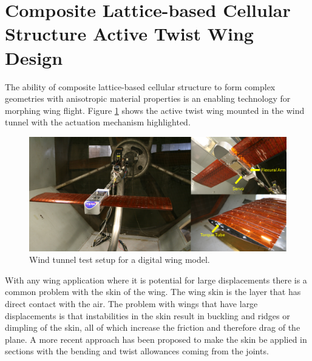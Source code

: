 \documentclass[11pt]{ucthesis}
\begin{document}
\section{Composite Lattice-based Cellular Structure Active Twist Wing Design}

The ability of composite lattice-based cellular structure to form complex geometries with anisotropic material properties is an enabling technology for morphing wing flight. Figure \ref{fig:plane} shows the active twist wing mounted in the wind tunnel with the actuation mechanism highlighted.

\begin{figure}[h]
\centering
\includegraphics[width=1\linewidth]{./Figures/Plane.png}
\caption{Wind tunnel test setup for a digital wing model.}
\label{fig:plane}
\end{figure}

With any wing application where it is potential for large displacements there is a common problem with the skin of the wing. The wing skin is the layer that has direct contact with the air. The problem with wings that have large displacements is that instabilities in the skin result in buckling and ridges or dimpling of the skin, all of which increase the friction and therefore drag of the plane. A more recent approach has been proposed to make the skin be applied in sections with the bending and twist allowances coming from the joints.
\end{document}
